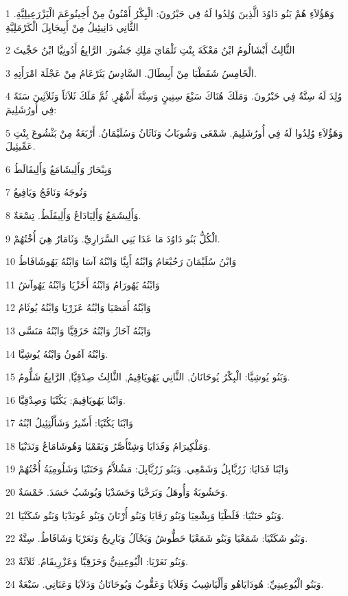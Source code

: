 \par 1 وَهَؤُلاَءِ هُمْ بَنُو دَاوُدَ الَّذِينَ وُلِدُوا لَهُ فِي حَبْرُونَ: الْبِكْرُ أَمْنُونُ مِنْ أَخِينُوعَمَ الْيَزْرَعِيلِيَّةِ. الثَّانِي دَانِيئِيلُ مِنْ أَبِيجَايِلَ الْكَرْمَلِيَّةِ
\par 2 الثَّالِثُ أَبْشَالُومُ ابْنُ مَعْكَةَ بِنْتِ تَلْمَايَ مَلِكِ جَشُورَ. الرَّابِعُ أَدُونِيَّا ابْنُ حَجِّيثَ
\par 3 الْخَامِسُ شَفَطْيَا مِنْ أَبِيطَالَ. السَّادِسُ يَثَرْعَامُ مِنْ عَجْلَةَ امْرَأَتِهِ.
\par 4 وُلِدَ لَهُ سِتَّةٌ فِي حَبْرُونَ. وَمَلَكَ هُنَاكَ سَبْعَ سِنِينٍ وَسِتَّةَ أَشْهُرٍ, ثُمَّ مَلَكَ ثَلاَثاً وَثَلاَثِينَ سَنَةً فِي أُورُشَلِيمَ:
\par 5 وَهَؤُلاَءِ وُلِدُوا لَهُ فِي أُورُشَلِيمَ. شَمْعَى وَشُوبَابُ وَنَاثَانُ وَسُلَيْمَانُ. أَرْبَعَةٌ مِنْ بَثْشُوعَ بِنْتِ عَمِّيئِيلَ.
\par 6 وَيِبْحَارُ وَأَلِيشَامَعُ وَأَلِيفَالَطُ
\par 7 وَنُوجَهُ وَنَافَجُ وَيَافِيعُ
\par 8 وَأَلِيشَمَعُ وَأَلِيَادَاعُ وَأَلِيفَلَطُ. تِسْعَةٌ.
\par 9 الْكُلُّ بَنُو دَاوُدَ مَا عَدَا بَنِي السَّرَارِيِّ. وَثَامَارُ هِيَ أُخْتُهُمْ.
\par 10 وَابْنُ سُلَيْمَانَ رَحُبْعَامُ وَابْنُهُ أَبِيَّا وَابْنُهُ آسَا وَابْنُهُ يَهُوشَافَاطُ
\par 11 وَابْنُهُ يَهُورَامُ وَابْنُهُ أَخَزْيَا وَابْنُهُ يَهُوآشُ
\par 12 وَابْنُهُ أَمَصْيَا وَابْنُهُ عَزَرْيَا وَابْنُهُ يُوثَامُ
\par 13 وَابْنُهُ آحَازُ وَابْنُهُ حَزَقِيَّا وَابْنُهُ مَنَسَّى
\par 14 وَابْنُهُ آمُونُ وَابْنُهُ يُوشِيَّا.
\par 15 وَبَنُو يُوشِيَّا: الْبِكْرُ يُوحَانَانُ, الثَّانِي يَهُويَاقِيمُ, الثَّالِثُ صِدْقِيَّا, الرَّابِعُ شَلُّومُ.
\par 16 وَابْنَا يَهُويَاقِيمَ: يَكُنْيَا وَصِدْقِيَّا.
\par 17 وَابْنَا يَكُنْيَا: أَسِّيرُ وَشَأَلْتِئِيلُ ابْنُهُ
\par 18 وَمَلْكِيرَامُ وَفَدَايَا وَشِنْأَصَّرُ وَيَقَمْيَا وَهُوشَامَاعُ وَنَدَبْيَا.
\par 19 وَابْنَا فَدَايَا: زَرُبَّابِلُ وَشَمْعِي. وَبَنُو زَرُبَّابِلَ: مَشُلاَّمُ وَحَنَنْيَا وَشَلُومِيَةُ أُخْتُهُمْ
\par 20 وَحَشُوبَةُ وَأُوهَلُ وَبَرَخْيَا وَحَسَدْيَا وَيُوشَبُ حَسَدَ. خَمْسَةٌ.
\par 21 وَبَنُو حَنَنْيَا: فَلَطْيَا وَيِشْعِيَا وَبَنُو رَفَايَا وَبَنُو أُرْنَانَ وَبَنُو عُوبَدْيَا وَبَنُو شَكَنْيَا.
\par 22 وَبَنُو شَكَنْيَا: شَمَعْيَا وَبَنُو شَمَعْيَا حَطُّوشُ وَيَجْآلُ وَبَارِيحُ وَنَعَرْيَا وَشَافَاطُ. سِتَّةٌ.
\par 23 وَبَنُو نَعَرْيَا: الْيُوعِينِيُّ وَحَزَقِيَّا وَعَزْرِيقَامُ. ثَلاَثَةٌ.
\par 24 وَبَنُو الْيُوعِينِيِّ: هُودَايَاهُو وَأَلْيَاشِيبُ وَفَلاَيَا وَعَقُّوبُ وَيُوحَانَانُ وَدَلاَيَا وَعَنَانِي. سَبْعَةٌ.

